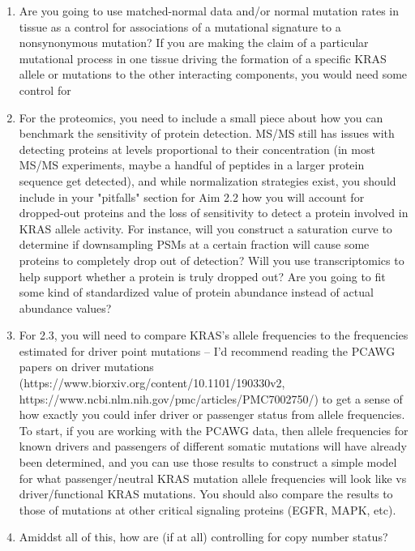{\begin{enumerate}
\item Are you going to use matched-normal data and/or normal mutation rates in tissue as a control for associations of a mutational signature to a nonsynonymous mutation? If you are making the claim of a particular mutational process in one tissue driving the formation of a specific KRAS allele or mutations to the other interacting components, you would need some control for 

\item For the proteomics, you need to include a small piece about how you can benchmark the sensitivity of protein detection. MS/MS still has issues with detecting proteins at levels proportional to their concentration (in most MS/MS experiments, maybe a handful of peptides in a larger protein sequence get detected), and while normalization strategies exist, you should include in your "pitfalls" section for Aim 2.2 how you will account for dropped-out proteins and the loss of sensitivity to detect a protein involved in KRAS allele activity. For instance, will you construct a saturation curve to determine if downsampling PSMs at a certain fraction will cause some proteins to completely drop out of detection? Will you use transcriptomics to help support whether a protein is truly dropped out? Are you going to fit some kind of standardized value of protein abundance instead of actual abundance values?

\item For 2.3, you will need to compare KRAS's allele frequencies to the frequencies estimated for driver point mutations -- I'd recommend reading the PCAWG papers on driver mutations (https://www.biorxiv.org/content/10.1101/190330v2, https://www.ncbi.nlm.nih.gov/pmc/articles/PMC7002750/) to get a sense of how exactly you could infer driver or passenger status from allele frequencies. To start, if you are working with the PCAWG data, then allele frequencies for known drivers and passengers of different somatic mutations will have already been determined, and you can use those results to construct a simple model for what passenger/neutral KRAS mutation allele frequencies will look like vs driver/functional KRAS mutations. You should also compare the results to those of mutations at other critical signaling proteins (EGFR, MAPK, etc). 

\item Amiddst all of this, how are (if at all) controlling for copy number status?


\end{enumerate}}
